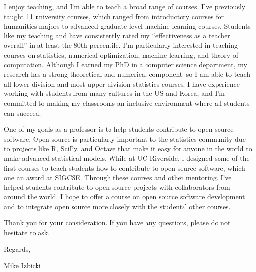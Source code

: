 \documentclass[12pt]{article}
\begin{document}
\noindent
I enjoy teaching,
and I'm able to teach a broad range of courses.
I've previously taught 11 university courses,
which ranged from introductory courses for humanities majors to advanced graduate-level machine learning courses.
Students like my teaching and have consistently rated my ``effectiveness as a teacher overall'' in at least the 80th percentile.
I'm particularly interested in teaching courses on statistics, numerical optimization, machine learning, and theory of computation.
Although I earned my PhD in a computer science department,
my research has a strong theoretical and numerical component,
so I am able to teach all lower division and most upper division statistics courses.
I have experience working with students from many cultures in the US and Korea,
and I'm committed to making my classrooms an inclusive environment where all students can succeed.

\noindent
One of my goals as a professor is to help students contribute to open source software.
Open source is particularly important to the statistics community due to  projects like R, SciPy, and Octave that make it easy for anyone in the world to make advanced statistical models.
While at UC Riverside, I designed some of the first courses to teach students how to contribute to open source software, which one an award at SIGCSE.
Through these courses and other mentoring, 
I've helped students contribute to open source projects with collaborators from around the world.
I hope to offer a course on open source software development
and to integrate open source more closely with the students' other courses.

\noindent
Thank you for your consideration.
If you have any questions,
please do not hesitate to ask.

\noindent
Regards,

\vspace{-0.10in}
\noindent
Mike Izbicki
\end{document}
